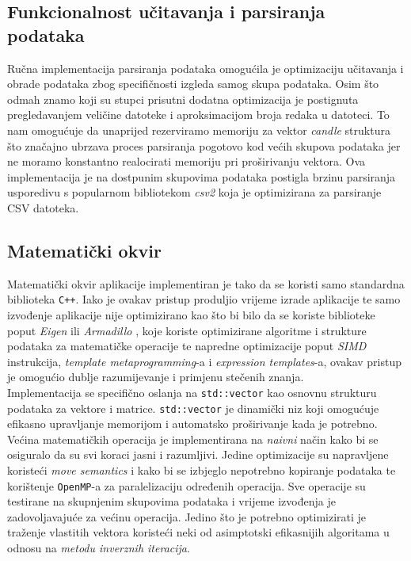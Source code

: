 \documentclass[zavrsnirad, upload]{fer}
\begin{document}
\subsection{Funkcionalnost učitavanja i parsiranja podataka}
Ručna implementacija parsiranja podataka omogućila je
optimizaciju učitavanja i obrade podataka zbog specifičnosti
izgleda samog skupa podataka. Osim što odmah znamo koji su stupci
prisutni dodatna optimizacija je postignuta pregledavanjem veličine
datoteke i aproksimacijom broja redaka u datoteci. To nam omogućuje
da unaprijed rezerviramo memoriju za vektor \emph{candle} struktura
što značajno ubrzava proces parsiranja pogotovo kod većih skupova
podataka jer ne moramo konstantno realocirati memoriju pri proširivanju
vektora. Ova implementacija je na dostpunim skupovima podataka
postigla brzinu parsiranja usporedivu s popularnom bibliotekom
\emph{csv2} \cite{csv2} koja je optimizirana za parsiranje CSV datoteka.

\subsection{Matematički okvir}
\label{sek:matematicki_okvir_rezultati}
Matematički okvir aplikacije implementiran je tako da
se koristi samo standardna biblioteka \texttt{C++}. Iako je ovakav pristup
produljio vrijeme izrade aplikacije te samo izvođenje aplikacije
nije optimizirano kao što bi bilo da se koriste biblioteke poput
\emph{Eigen} \cite{Eigen3} ili \emph{Armadillo} \cite{10980539},
koje koriste optimizirane algoritme i strukture podataka za
matematičke operacije te napredne optimizacije poput \emph{SIMD} instrukcija,
\emph{template metaprogramming}-a i \emph{expression templates}-a,
ovakav pristup je omogućio dublje razumijevanje i primjenu
stečenih znanja.\\
Implementacija se specifično oslanja
na \texttt{std::vector} kao osnovnu strukturu podataka za vektore i
matrice. \texttt{std::vector} je dinamički niz koji omogućuje
efikasno upravljanje memorijom i automatsko proširivanje
kada je potrebno.\\
Većina matematičkih operacija je implementirana na \emph{naivni} način
kako bi se osiguralo da su svi koraci jasni i razumljivi. Jedine
optimizacije su napravljene koristeći \emph{move semantics} i
kako bi se izbjeglo nepotrebno kopiranje podataka te korištenje
\texttt{OpenMP}-a \cite{660313} za paralelizaciju određenih operacija.
Sve operacije su testirane na skupnjenim skupovima podataka i
vrijeme izvođenja je zadovoljavajuće za većinu operacija. Jedino
što je potrebno optimizirati je traženje vlastitih vektora koristeći
neki od asimptotski efikasnijih algoritama u odnosu na \emph{metodu
inverznih iteracija}.
\end{document}
